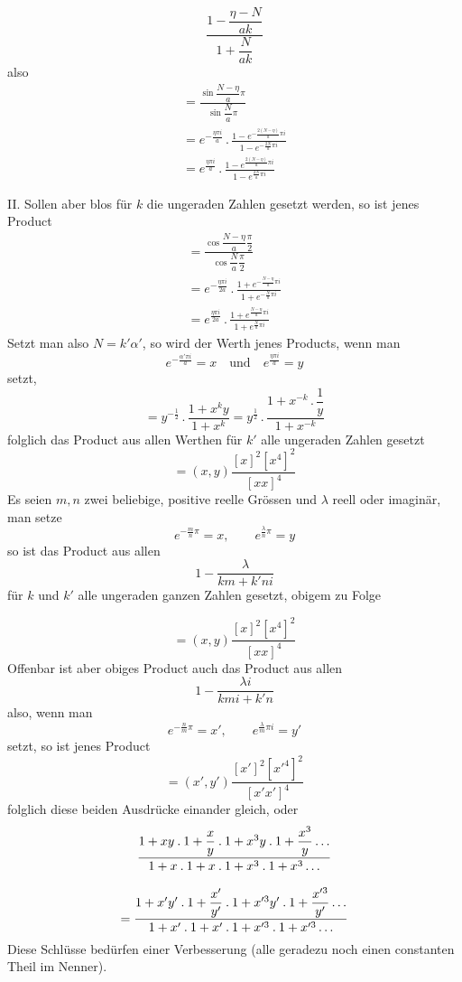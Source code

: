 \[
\frac{1-\dfrac{\eta-N}{ak}}{1+\dfrac{N}{ak}}
\]
\noindent also
\[
\begin{gathered}=\frac{\sin\dfrac{N-\eta}{a}\pi}{\sin\dfrac{N}{a}\pi}\\[9pt]=e^{-\frac{\eta\pi i}{a}}\mathbin{.}
 \frac{1-e^{-\frac{2(N-\eta)}{a}\pi i}}{1-e^{-\frac{2N}{a}\pi i}}\\[9pt]=e^{\frac{\eta\pi i}{a}}\mathbin{.}
 \frac{1-e^{\frac{2(N-\eta)}{a}\pi i}}{1-e^{\frac{2N}{a}\pi i}}\end{gathered}
\]

II. Sollen aber blos für $k$ die ungeraden Zahlen gesetzt werden, so ist
jenes Product
\[
\begin{gathered}=\frac{\cos\dfrac{N-\eta}{a}\dfrac{\pi}{2}}{\cos\dfrac{N}{a}\dfrac{\pi}{2}}\\[9pt]=e^{-\frac{\eta\pi i}{2a}}\mathbin{.}
 \frac{1+e^{-\frac{N-\eta}{a}\pi i}}{1+e^{-\frac{N}{a}\pi i}}\\[9pt]=e^{\frac{\eta\pi i}{2a}}\mathbin{.}
 \frac{1+e^{\frac{N-\eta}{a}\pi i}}{1+e^{\frac{N}{a}\pi i}}\end{gathered}
\]
Setzt man also $N=k'\alpha'$, so wird der Werth jenes Products, wenn man
\[
e^{-\frac{\alpha'\pi i}{a}}=x\quad\text{und}\quad
e^{\frac{\eta\pi i}{a}}=y
\]
setzt,
\[
=y^{-\frac12}\mathbin{.}\frac{1+x^k y}{1+x^k}
=y^{\frac12}\mathbin{.}\frac{1+x^{-k}\mathbin{.}\dfrac1y}{1+x^{-k}}
\]
folglich das Product aus allen Werthen für $k'$ alle ungeraden Zahlen gesetzt
\[
=(x,y)\frac{[x]^2[x^4]^2}{[xx]^4}
\]
Es seien $m,n$ zwei beliebige, positive reelle Grössen und $\lambda$ reell oder
imaginär, man setze
\[
e^{-\frac mn\pi}=x,\qquad e^{\frac\lambda n\pi}=y
\]
so ist das Product aus allen
\[
1-\frac{\lambda}{km+k'ni}
\]
für $k$ und $k'$ alle ungeraden ganzen Zahlen gesetzt, obigem zu Folge

\[
=(x,y)\frac{[x]^2[x^4]^2}{[xx]^4}
\]
\noindent Offenbar ist aber obiges Product auch das Product aus allen
\[
1-\frac{\lambda i}{kmi+k'n}
\]
also, wenn man
\[
e^{-\frac nm\pi}=x',\qquad e^{\frac\lambda m\pi i}=y'
\]
setzt, so ist jenes Product
\[
=(x',y')\frac{[x']^2[x'^4]^2}{[x'x']^4}
\]
folglich diese beiden Ausdrücke einander gleich, oder
\[
\begin{gathered}\frac{1+xy\mathbin{.}1+\dfrac xy\mathbin{.}1+x^3y\mathbin{.}1+\dfrac{x^3}y\mathinner{.\,.\,.}}
 {1+x\mathbin{.}1+x\mathbin{.}1+x^3\mathbin{.}1+x^3\mathinner{.\,.\,.}}\\[9pt]=
\frac{1+x'y'\mathbin{.}1+\dfrac{x'}{y'}\mathbin{.}1+x'^3y'\mathbin{.}1+\dfrac{x'^3}{y'}\mathinner{.\,.\,.}}
 {1+x'\mathbin{.}1+x'\mathbin{.}1+x'^3\mathbin{.}1+x'^3\mathinner{.\,.\,.}}\end{gathered}
\]
Diese Schlüsse bedürfen einer Verbesserung (alle geradezu noch einen constanten Theil im Nenner).

